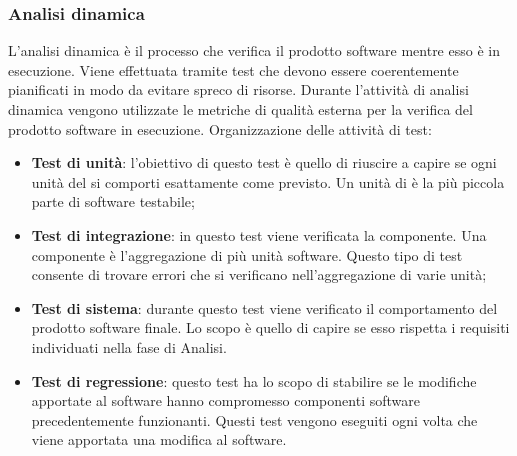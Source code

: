     \subsubsection{Analisi dinamica}
    L'analisi dinamica è il processo che verifica il prodotto software mentre esso è in esecuzione. Viene effettuata tramite test che devono essere coerentemente pianificati in modo da evitare spreco di risorse.
    Durante l'attività di analisi dinamica vengono utilizzate le metriche di qualità esterna per la verifica del prodotto software in esecuzione.
    Organizzazione delle attività di test:
    \begin{itemize}
      \item \textbf{Test di unità}: l'obiettivo di questo test è quello di riuscire a capire se ogni unità del  si comporti esattamente come previsto. Un unità di  è la più piccola parte di software testabile;
      \item \textbf{Test di integrazione}: in questo test viene verificata la componente. Una componente è l'aggregazione di più unità software.
      Questo tipo di test consente di trovare errori che si verificano nell'aggregazione di varie unità;
      \item \textbf{Test di sistema}: durante questo test viene verificato il comportamento del prodotto software finale. Lo scopo è quello di capire se esso rispetta i requisiti individuati nella fase di Analisi.
      \item \textbf{Test di regressione}: questo test ha lo scopo di stabilire se le modifiche apportate al software hanno compromesso componenti software precedentemente funzionanti.
      Questi test vengono eseguiti ogni volta che viene apportata una modifica al software.
    \end{itemize}
